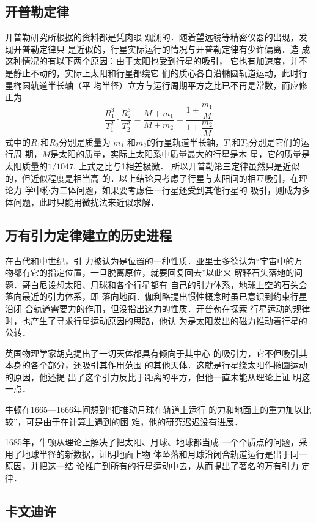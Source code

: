 \subsection{开普勒定律}
开普勒研究所根据的资料都是凭肉眼
观测的．随着望远镜等精密仪器的出现，发现开普勒定律只
是近似的，行星实际运行的情况与开普勒定律有少许偏离．造
成这种情况的有以下两个原因：由于太阳也受到行星的吸引，
它也有加速度，并不是静止不动的，实际上太阳和行星都绕它
们的质心各自沿椭圆轨道运动，此时行星椭圆轨道半长轴（平
均半径）立方与运行周期平方之比已不再是常数，而应修正为
\[\frac{R_1^3}{T^2_1}\cdot \frac{R^3_2}{T^2_2}=\frac{M+m_1}{M+m_2}=\frac{1+\dfrac{m_1}{M}}{1+\dfrac{m_2}{M}}\]
式中的$R_1$和$R_2$分别是质量为
$m_1$
和$m_2$的行星轨道半长轴，$T_1$和$T_2$分别是它们的运行周
期，$M$是太阳的质量，实际上太阳系中质量最大的行星是木
星，它的质量是太阳质量的$1/1047$, 上式之比与1相差极微．
所以开普勒第三定律虽然只是近似的，但近似程度是相当高
的．以上结论只考虑了行星与太阳间的相互吸引，在理论力
学中称为二体问题，如果要考虑任一行星还受到其他行星的
吸引，则成为多体问题，此时只能用微扰法来近似求解．

\subsection{万有引力定律建立的历史进程}

在古代和中世纪，引
力被认为是位置的一种性质．亚里士多德认为“宇宙中的万
物都有它的指定位置，一旦脱离原位，就要回复回去”以此来
解释石头落地的问题．哥白尼设想太阳、月球和各个行星都有
自己的引力体系，地球上空的石头会落向最近的引力体系，即
落向地面．伽利略提出惯性概念时虽已意识到约束行星沿闭
合轨道需要力的作用，但没指出这力的性质．开普勒在探索
行星运动的规律时，也产生了寻求行星运动原因的思路，他认
为是太阳发出的磁力推动着行星的公转．

英国物理学家胡克提出了一切天体都具有倾向于其中心
的吸引力，它不但吸引其本身的各个部分，还吸引其作用范围
的其他天体．这就是行星绕太阳作椭圆运动的原因，他还提
出了这个引力反比于距离的平方，但他一直未能从理论上证
明这一点．

牛顿在1665—1666年间想到“把推动月球在轨道上运行
的力和地面上的重力加以比较”，可是由于在计算上遇到的困
难，他的研究迟迟没有进展．

1685年，牛顿从理论上解决了把太阳、月球、地球都当成
一个个质点的问题，采用了地球半径的新数据，证明地面上物
体坠落和月球沿闭合轨道运行是出于同一原因，并把这一结
论推广到所有的行星运动中去，从而提出了著名的万有引力
定律．

\subsection{卡文迪许}

